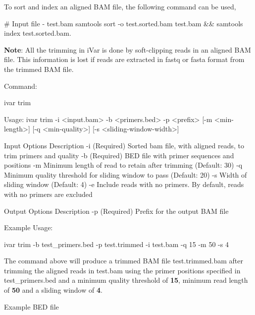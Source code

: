 To sort and index an aligned B\+AM file, the following command can be used,


\begin{DoxyCode}
# Input file - test.bam
samtools sort -o test.sorted.bam test.bam && samtools index test.sorted.bam.
\end{DoxyCode}


{\bfseries Note}\+: All the trimming in i\+Var is done by soft-\/clipping reads in an aligned B\+AM file. This information is lost if reads are extracted in fastq or fasta format from the trimmed B\+AM file.

Command\+: 
\begin{DoxyCode}
ivar trim

Usage: ivar trim -i <input.bam> -b <primers.bed> -p <prefix> [-m <min-length>] [-q <min-quality>] [-s
       <sliding-window-width>]

Input Options    Description
           -i    (Required) Sorted bam file, with aligned reads, to trim primers and quality
           -b    (Required) BED file with primer sequences and positions
           -m    Minimum length of read to retain after trimming (Default: 30)
           -q    Minimum quality threshold for sliding window to pass (Default: 20)
           -s    Width of sliding window (Default: 4)
           -e    Include reads with no primers. By default, reads with no primers are excluded

Output Options   Description
           -p    (Required) Prefix for the output BAM file
\end{DoxyCode}


Example Usage\+: 
\begin{DoxyCode}
ivar trim -b test\_primers.bed -p test.trimmed -i test.bam -q 15 -m 50 -s 4
\end{DoxyCode}


The command above will produce a trimmed B\+AM file test.\+trimmed.\+bam after trimming the aligned reads in test.\+bam using the primer positions specified in test\+\_\+primers.\+bed and a minimum quality threshold of {\bfseries 15}, minimum read length of {\bfseries 50} and a sliding window of {\bfseries 4}.

Example B\+ED file


